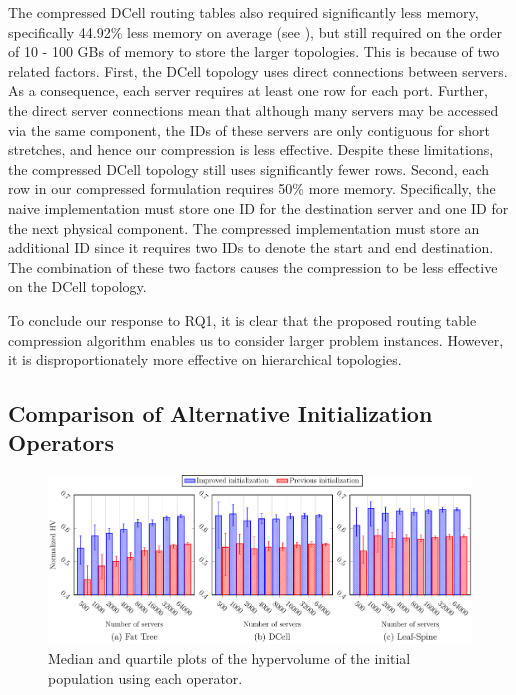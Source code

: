 The compressed DCell routing tables also required significantly less memory, specifically 44.92\% less memory on average (see ), but still required on the order of 10 - 100 GBs of memory to store the larger topologies. This is because of two related factors. First, the DCell topology uses direct connections between servers. As a consequence, each server requires at least one row for each port. Further, the direct server connections mean that although many servers may be accessed via the same component, the IDs of these servers are only contiguous for short stretches, and hence our compression is less effective. Despite these limitations, the compressed DCell topology still uses significantly fewer rows. Second, each row in our compressed formulation requires 50\% more memory. Specifically, the naive implementation must store one ID for the destination server and one ID for the next physical component. The compressed implementation must store an additional ID since it requires two IDs to denote the start and end destination. The combination of these two factors causes the compression to be less effective on the DCell topology.

To conclude our response to RQ1, it is clear that the proposed routing table compression algorithm enables us to consider larger problem instances. However, it is disproportionately more effective on hierarchical topologies.

\subsection{Comparison of Alternative Initialization Operators}

\begin{figure}[t!]
    \includegraphics[width=\linewidth]{figures/graphs/initialization/initialization_hv}
    \caption{Median and quartile plots of the hypervolume of the initial population using each operator.}
    \label{fig:init_hv}
\end{figure}


